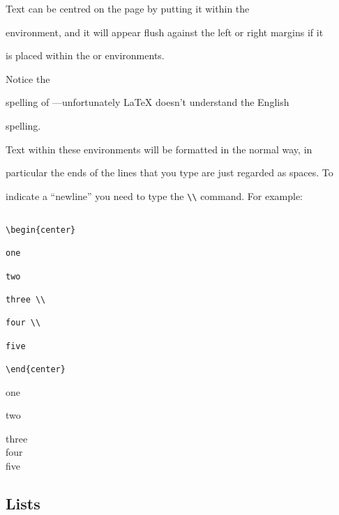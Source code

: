 Text can be centred on the page by putting it within the 

environment, and it will appear flush against the left or right margins if it

is placed within the  or  environments.

Notice the

spelling of ---unfortunately \LaTeX{} doesn't understand the English

spelling.



Text within these environments will be formatted in the normal way, in

{\samepage

particular the ends of the lines that you type are just regarded as spaces.  To

indicate a ``newline'' you need to type the \verb|\\| command.  For example:

\egstart

\begin{verbatim}

\begin{center}

one

two

three \\

four \\

five

\end{center}

\end{verbatim}

\egmid%

\begin{center}

one

two

three \\

four \\

five

\end{center}

\egend

}



\subsection{Lists}



